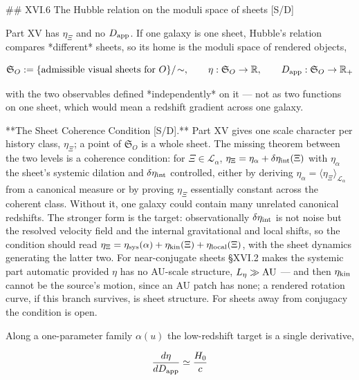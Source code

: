 ## XVI.6 The Hubble relation on the moduli space of sheets [S/D]

Part XV has $\eta_\Xi$ and no $D_{\rm app}$. If one galaxy is one sheet, Hubble's relation compares *different* sheets, so its home is the moduli space of rendered objects,

$$\mathfrak S_O := \{\text{admissible visual sheets for }O\}/\!\sim,\qquad \eta:\mathfrak S_O\to\mathbb R,\qquad D_{\rm app}:\mathfrak S_O\to\mathbb R_+$$

with the two observables defined *independently* on it — not as two functions on one sheet, which would mean a redshift gradient across one galaxy.

**The Sheet Coherence Condition [S/D].** Part XV gives one scale character per history class, $\eta_\Xi$; a point of $\mathfrak S_O$ is a whole sheet. The missing theorem between the two levels is a coherence condition: for $\Xi\in\mathscr L_\alpha$, $\eta_\Xi = \eta_\alpha+\delta\eta_{\rm int}(\Xi)$ with $\eta_\alpha$ the sheet's systemic dilation and $\delta\eta_{\rm int}$ controlled, either by deriving $\eta_\alpha = \langle\eta_\Xi\rangle_{\mathscr L_\alpha}$ from a canonical measure or by proving $\eta_\Xi$ essentially constant across the coherent class. Without it, one galaxy could contain many unrelated canonical redshifts. The stronger form is the target: observationally $\delta\eta_{\rm int}$ is not noise but the resolved velocity field and the internal gravitational and local shifts, so the condition should read $\eta_\Xi = \eta_{\rm sys}(\alpha)+\eta_{\rm kin}(\Xi)+\eta_{\rm local}(\Xi)$, with the sheet dynamics generating the latter two. For near-conjugate sheets §XVI.2 makes the systemic part automatic provided $\eta$ has no AU-scale structure, $L_\eta\gg{\rm AU}$ — and then $\eta_{\rm kin}$ cannot be the source's motion, since an AU patch has none; a rendered rotation curve, if this branch survives, is sheet structure. For sheets away from conjugacy the condition is open.

Along a one-parameter family $\alpha(u)$ the low-redshift target is a single derivative,

$$\frac{d\eta}{dD_{\rm app} }\simeq\frac{H_0}{c}$$

